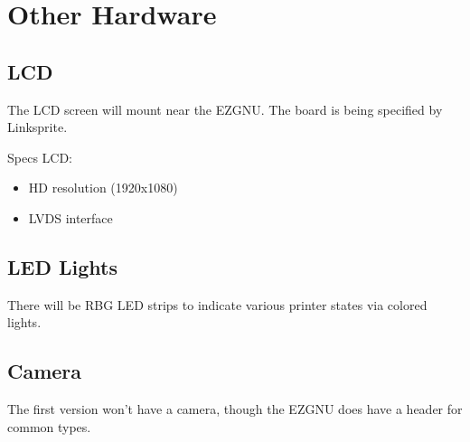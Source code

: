 \section{Other Hardware}

\subsection{LCD}
The LCD screen will mount near the EZGNU. The board is being specified by
Linksprite.

Specs LCD:

\begin{itemize}
  \item{HD resolution (1920x1080)}
  \item{LVDS interface}
\end{itemize}


\subsection{LED Lights}
There will be RBG LED strips to indicate various printer states via colored
lights.

\subsection{Camera}
The first version won't have a camera, though the EZGNU does have a header for
common types.

